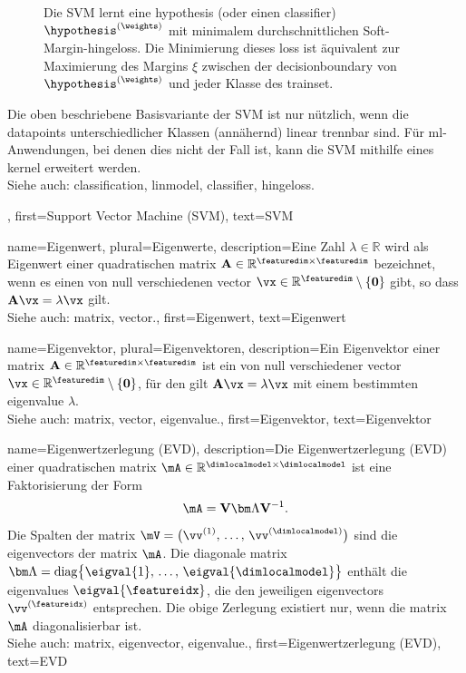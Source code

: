 {{{{{{\begin{figure}[H]
\begin{center}
				\caption{Die SVM lernt eine \gls{hypothesis} (oder einen \gls{classifier}) 
					$\hypothesis^{(\weights)}$ mit minimalem durchschnittlichen 
					Soft-Margin-\gls{hingeloss}. 
					Die Minimierung dieses \gls{loss} ist äquivalent zur Maximierung des Margins $\xi$ 
					zwischen der \gls{decisionboundary} von $\hypothesis^{(\weights)}$ 
					und jeder Klasse des \gls{trainset}.}
				\label{fig_svm_gls_dict}
			\end{center}
		\end{figure}
		Die oben beschriebene Basisvariante der SVM ist nur nützlich, 
		wenn die \glspl{datapoint} unterschiedlicher Klassen (annähernd) linear trennbar sind. 
		Für \gls{ml}-Anwendungen, bei denen dies nicht der Fall ist, 
		kann die SVM mithilfe eines \gls{kernel} erweitert werden.\\
		Siehe auch: \gls{classification}, \gls{linmodel}, \gls{classifier}, \gls{hingeloss}.},
	first={Support Vector Machine (SVM)},
	text={SVM} 
}

{name={Eigenwert}, plural={Eigenwerte}, 
	description={Eine Zahl 
		$\lambda \in \mathbb{R}$ wird als Eigenwert einer quadratischen \gls{matrix} 
		$\mathbf{A} \in \mathbb{R}^{\featuredim \times \featuredim}$ bezeichnet, 
		wenn es einen von null verschiedenen \gls{vector} 
		$\vx \in \mathbb{R}^{\featuredim} \setminus \{ \mathbf{0} \}$ gibt, 
		so dass $\mathbf{A} \vx = \lambda \vx$ gilt.\\
		Siehe auch: \gls{matrix}, \gls{vector}.},
	first={Eigenwert},
	text={Eigenwert} 
}

{name={Eigenvektor}, plural={Eigenvektoren}, 
	description={Ein 
		Eigenvektor einer \gls{matrix} 
		$\mathbf{A} \in \mathbb{R}^{\featuredim \times \featuredim}$ 
		ist ein von null verschiedener \gls{vector} 
		$\vx \in \mathbb{R}^{\featuredim} \setminus \{ \mathbf{0} \}$, 
		für den gilt $\mathbf{A} \vx = \lambda \vx$ mit einem bestimmten 
		\gls{eigenvalue} $\lambda$.\\
		Siehe auch: \gls{matrix}, \gls{vector}, \gls{eigenvalue}.},
	first={Eigenvektor},
	text={Eigenvektor} 
}

{name={Eigenwertzerlegung (EVD)}, 
	description={Die 
		Eigenwertzerlegung (EVD) einer quadratischen \gls{matrix} 
		$\mA \in \mathbb{R}^{\dimlocalmodel \times \dimlocalmodel}$ 
		ist eine Faktorisierung der Form
		$$\mA = \mathbf{V} {\bm \Lambda} \mathbf{V}^{-1}.$$ 
		Die Spalten der \gls{matrix} 
		$\mV = \big( \vv^{(1)}, \,\ldots, \,\vv^{(\dimlocalmodel)} \big)$ 
		sind die \glspl{eigenvector} der \gls{matrix} $\mA$. 
		Die diagonale \gls{matrix} 
		${\bm \Lambda} = {\rm diag} \big\{ \eigval{1}, \,\ldots, \,\eigval{\dimlocalmodel} \big\}$ 
		enthält die \glspl{eigenvalue} $\eigval{\featureidx}$, 
		die den jeweiligen \glspl{eigenvector} $\vv^{(\featureidx)}$ entsprechen. 
		Die obige Zerlegung existiert nur, wenn die \gls{matrix} $\mA$ diagonalisierbar ist.\\
		Siehe auch: \gls{matrix}, \gls{eigenvector}, \gls{eigenvalue}.},
	first={Eigenwertzerlegung (EVD)},
	text={EVD} 
}

}}}}
